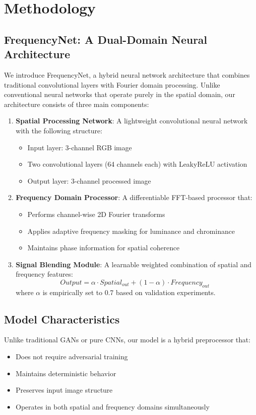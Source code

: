 \documentclass{article}
\begin{document}
\section{Methodology}

\subsection{FrequencyNet: A Dual-Domain Neural Architecture}
We introduce FrequencyNet, a hybrid neural network architecture that combines traditional convolutional layers with Fourier domain processing. Unlike conventional neural networks that operate purely in the spatial domain, our architecture consists of three main components:

\begin{enumerate}
    \item \textbf{Spatial Processing Network}: A lightweight convolutional neural network with the following structure:
    \begin{itemize}
        \item Input layer: 3-channel RGB image
        \item Two convolutional layers (64 channels each) with LeakyReLU activation
        \item Output layer: 3-channel processed image
    \end{itemize}
    
    \item \textbf{Frequency Domain Processor}: A differentiable FFT-based processor that:
    \begin{itemize}
        \item Performs channel-wise 2D Fourier transforms
        \item Applies adaptive frequency masking for luminance and chrominance
        \item Maintains phase information for spatial coherence
    \end{itemize}
    
    \item \textbf{Signal Blending Module}: A learnable weighted combination of spatial and frequency features:
    \begin{equation}
        Output = \alpha \cdot Spatial_{out} + (1-\alpha) \cdot Frequency_{out}
    \end{equation}
    where $\alpha$ is empirically set to 0.7 based on validation experiments.
\end{enumerate}

\subsection{Model Characteristics}
Unlike traditional GANs or pure CNNs, our model is a hybrid preprocessor that:
\begin{itemize}
    \item Does not require adversarial training
    \item Maintains deterministic behavior
    \item Preserves input image structure
    \item Operates in both spatial and frequency domains simultaneously
\end{itemize}
\end{document}
